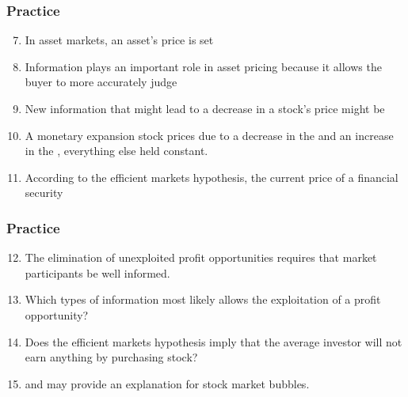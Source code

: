 \documentclass{beamer}
\begin{document}
\begin{practiceframe}
    \frametitle{Practice}

    \begin{enumerate}
    \setcounter{enumi}{6}
        \item In asset markets, an asset's price is set \underline{\hspace{3cm}}
        \item Information plays an important role in asset pricing because it allows the buyer to more accurately judge \underline{\hspace{3cm}}
        \item New information that might lead to a decrease in a stock's price might be \underline{\hspace{3cm}}
        \item A monetary expansion \underline{\hspace{3cm}} stock prices due to a decrease in the \underline{\hspace{3cm}} and an increase in the \underline{\hspace{3cm}}, everything else held constant.
        \item According to the efficient markets hypothesis, the current price of a financial security \underline{\hspace{3cm}}
    \end{enumerate}

\end{practiceframe}

\begin{practiceframe}
    \frametitle{Practice}

    \begin{enumerate}
    \setcounter{enumi}{11}
        \item The elimination of unexploited profit opportunities requires that \underline{\hspace{3cm}} market participants be well informed.
        \item Which types of information most likely allows the exploitation of a profit opportunity?
        \item Does the efficient markets hypothesis imply that the average investor will not earn anything by purchasing stock?
        \item \underline{\hspace{3cm}} and \underline{\hspace{3cm}} may provide an explanation for stock market bubbles.
    \end{enumerate}

\end{practiceframe}
\end{document}
